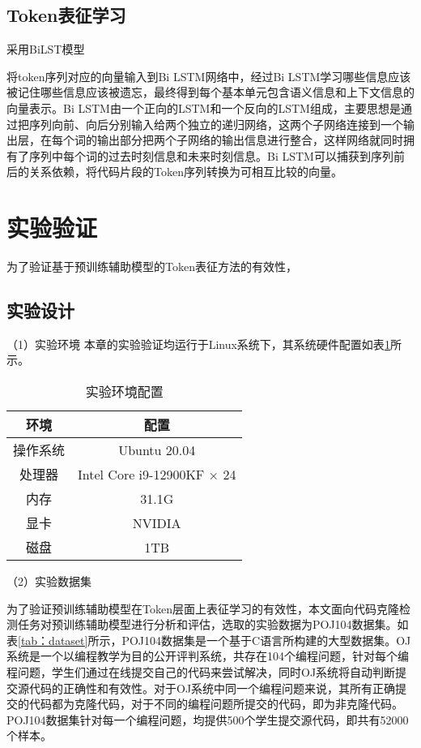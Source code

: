 \subsection{Token表征学习}
采用BiLST模型

将token序列对应的向量输入到Bi LSTM网络中，经过Bi LSTM学习哪些信息应该被记住哪些信息应该被遗忘，最终得到每个基本单元包含语义信息和上下文信息的向量表示。Bi LSTM由一个正向的LSTM和一个反向的LSTM组成，主要思想是通过把序列向前、向后分别输入给两个独立的递归网络，这两个子网络连接到一个输出层，在每个词的输出部分把两个子网络的输出信息进行整合，这样网络就同时拥有了序列中每个词的过去时刻信息和未来时刻信息。Bi LSTM可以捕获到序列前后的关系依赖，将代码片段的Token序列转换为可相互比较的向量。
\section{实验验证}
为了验证基于预训练辅助模型的Token表征方法的有效性，

\subsection{实验设计}
（1）实验环境
本章的实验验证均运行于Linux系统下，其系统硬件配置如表\ref{tab:environment}所示。

\begin{table}
  \centering
  \caption{实验环境配置} 
  \label{tab:environment}
  \begin{tabular*}{0.5\textwidth}{@{\extracolsep{\fill}}cc}
  \toprule
    环境			&配置		\\
  \midrule
    操作系统		&Ubuntu 20.04 \\
    处理器			&Intel Core i9-12900KF × 24 \\
    内存			  &31.1G \\
    显卡			  &NVIDIA  \\
    磁盘			  &1TB \\
  \bottomrule
  \end{tabular*}
\end{table}

（2）实验数据集

为了验证预训练辅助模型在Token层面上表征学习的有效性，本文面向代码克隆检测任务对预训练辅助模型进行分析和评估，选取的实验数据为POJ104数据集。如表\ref{tab：dataset}所示，POJ104数据集是一个基于C语言所构建的大型数据集。OJ系统是一个以编程教学为目的公开评判系统，共存在104个编程问题，针对每个编程问题，学生们通过在线提交自己的代码来尝试解决，同时OJ系统将自动判断提交源代码的正确性和有效性。对于OJ系统中同一个编程问题来说，其所有正确提交的代码都为克隆代码，对于不同的编程问题所提交的代码，即为非克隆代码。POJ104数据集针对每一个编程问题，均提供500个学生提交源代码，即共有52000个样本。

